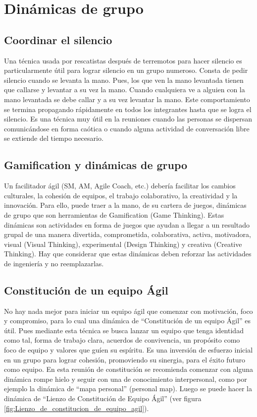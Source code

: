 \newpage
\section{Dinámicas de grupo}
\subsection{Coordinar el silencio}

Una técnica usada por rescatistas después de terremotos para hacer silencio es particularmente útil para lograr silencio en un grupo numeroso. Consta de pedir silencio cuando se levanta la mano. Pues, los que ven la mano levantada tienen que callarse y levantar a su vez la mano. Cuando cualquiera ve a alguien con la mano levantada se debe callar y a su vez levantar la mano. Este comportamiento se termina propagando rápidamente en todos los integrantes hasta que se logra el silencio. Es una técnica muy útil en la reuniones cuando las personas se dispersan comunicándose en forma caótica o cuando alguna actividad de conversación libre se extiende del tiempo necesario.

\subsection{Gamification y dinámicas de grupo}

Un facilitador ágil (SM, AM, Agile Coach, etc.) debería facilitar los cambios culturales, la cohesión de equipos, el trabajo colaborativo, la creatividad y la innovación. Para ello, puede traer a la mano, de su cartera de juegos, dinámicas de grupo que son herramientas de Gamification (Game Thinking). Estas dinámicas son actividades en forma de juegos que ayudan a llegar a un resultado grupal de una manera divertida, comprometida, colaborativa, activa, motivadora, visual (Visual Thinking), experimental (Design Thinking) y creativa (Creative Thinking). Hay que considerar que estas dinámicas deben reforzar las actividades de ingeniería y no reemplazarlas.

\subsection{Constitución de un equipo Ágil}

No hay nada mejor para iniciar un equipo ágil que comenzar con motivación, foco y compromiso, para lo cual una dinámica de  “Constitución de un equipo Ágil” es útil. Pues mediante esta técnica se busca lanzar un equipo que tenga identidad como tal, forma de trabajo clara, acuerdos de convivencia, un propósito como foco de equipo y valores que guíen su espíritu. Es una inversión de esfuerzo inicial en un grupo para lograr cohesión, promoviendo su sinergia, para el éxito futuro como equipo. En esta reunión de constitución se recomienda comenzar con alguna dinámica rompe hielo y seguir con una de conocimiento interpersonal, como por ejemplo la dinámica de “mapa personal” (personal map). Luego se puede hacer la dinámica de “Lienzo de Constitución de Equipo Ágil” (ver figura \ref{fig:Lienzo_de_constitucion_de_equipo_agil}). 

